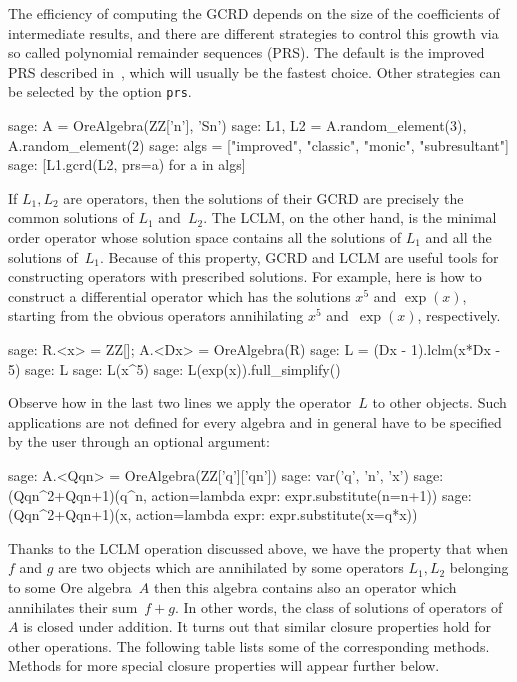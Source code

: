 \documentclass[11pt]{amsart}
\begin{document}
The efficiency of computing the GCRD depends on the size of the
coefficients of intermediate results, and there are different strategies to
control this growth via so called polynomial remainder sequences (PRS). The default is
the improved PRS described in~\cite{jaroschek13b}, which will usually be the
fastest choice. Other strategies can be selected by the option \verb|prs|.

\begin{sageexample}
  sage: A = OreAlgebra(ZZ['n'], 'Sn')
  sage: L1, L2 = A.random_element(3), A.random_element(2)
  sage: algs = ["improved", "classic", "monic", "subresultant"]
  sage: [L1.gcrd(L2, prs=a) for a in algs]
\end{sageexample}

If $L_1,L_2$ are operators, then the solutions of their GCRD are precisely the
common solutions of $L_1$ and~$L_2$. The LCLM, on the other hand, is the minimal
order operator whose solution space contains all the solutions of $L_1$ and
all the solutions of~$L_1$. Because of this property, GCRD and LCLM are
useful tools for constructing operators with prescribed solutions. For example,
here is how to construct a differential operator which has the solutions $x^5$
and $\exp(x)$, starting from the obvious operators annihilating $x^5$
and~$\exp(x)$, respectively.

\begin{sageexample}
  sage: R.<x> = ZZ[]; A.<Dx> = OreAlgebra(R)
  sage: L = (Dx - 1).lclm(x*Dx - 5)
  sage: L
  sage: L(x^5)
  sage: L(exp(x)).full_simplify() 
\end{sageexample}

Observe how in the last two lines we apply the operator~$L$ to other
objects. Such applications are not defined for every algebra and in general have
to be specified by the user through an optional argument:

\begin{sageexample}
  sage: A.<Qqn> = OreAlgebra(ZZ['q']['qn'])
  sage: var('q', 'n', 'x')
  sage: (Qqn^2+Qqn+1)(q^n, action=lambda expr: expr.substitute(n=n+1))
  sage: (Qqn^2+Qqn+1)(x, action=lambda expr: expr.substitute(x=q*x))
\end{sageexample}

Thanks to the LCLM operation discussed above, we have the property that when $f$
and $g$ are two objects which are annihilated by some operators $L_1,L_2$
belonging to some Ore algebra~$A$ then this algebra contains also an operator
which annihilates their sum~$f+g$. In other words, the class of solutions of operators of
$A$ is closed under addition. It turns out that similar closure properties hold
for other operations. The following table lists some of the corresponding
methods. Methods for more special closure properties will appear further below.
\end{document}
